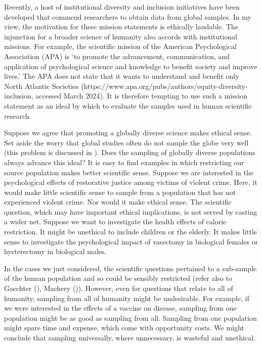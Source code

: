 \documentclass[
  single column]{article}
\begin{document}
Recently, a host of institutional diversity and inclusion initiatives
have been developed that commend researchers to obtain data from global
samples. In my view, the motivation for these mission statements is
ethically laudable. The injunction for a broader science of humanity
also accords with institutional missions. For example, the scientific
mission of the American Psychological Association (APA) is `to promote
the advancement, communication, and application of psychological science
and knowledge to benefit society and improve lives.' The APA does not
state that it wants to understand and benefit only North Atlantic
Societies (https://www.apa.org/pubs/authors/equity-diversity-inclusion,
accessed March 2024). It is therefore tempting to use such a mission
statement as an ideal by which to evaluate the samples used in human
scientific research.

Suppose we agree that promoting a globally diverse science makes ethical
sense. Set aside the worry that global studies often do not sample the
globe very well (this problem is discussed in
). Does the sampling of
globally diverse populations always advance this ideal? It is easy to
find examples in which restricting our source population makes better
scientific sense. Suppose we are interested in the psychological effects
of restorative justice among victims of violent crime. Here, it would
make little scientific sense to sample from a population that has not
experienced violent crime. Nor would it make ethical sense. The
scientific question, which may have important ethical implications, is
not served by casting a wider net. Suppose we want to investigate the
health effects of calorie restriction. It might be unethical to include
children or the elderly. It makes little sense to investigate the
psychological impact of vasectomy in biological females or hysterectomy
in biological males.

In the cases we just considered, the scientific questions pertained to a
sub-sample of the human population and so could be sensibly restricted
(refer also to Gaechter (), Machery
()). However, even for questions that
relate to all of humanity, sampling from all of humanity might be
undesirable. For example, if we were interested in the effects of a
vaccine on disease, sampling from one population might be as good as
sampling from all. Sampling from one population might spare time and
expense, which come with opportunity costs. We might conclude that
sampling universally, where unnecessary, is wasteful and unethical.
\end{document}

